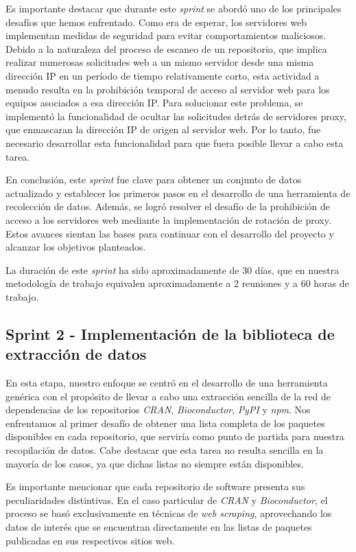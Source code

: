 Es importante destacar que durante este \textit{sprint} se abordó uno de los principales desafíos que hemos enfrentado. 
Como era de esperar, los servidores web implementan medidas de seguridad para evitar comportamientos maliciosos. Debido 
a la naturaleza del proceso de escaneo de un repositorio, que implica realizar numerosas solicitudes web a un mismo servidor 
desde una misma dirección IP en un período de tiempo relativamente corto, esta actividad a menudo resulta en la prohibición temporal de acceso al servidor web para los equipos asociados a esa dirección IP. Para solucionar este problema, se implementó la funcionalidad de ocultar las solicitudes detrás de servidores proxy, que enmascaran la dirección IP de origen al servidor web. Por lo tanto, fue necesario desarrollar esta funcionalidad para que fuera posible llevar a cabo esta tarea.

En conclusión, este \textit{sprint} fue clave para obtener un conjunto de datos actualizado y establecer los primeros 
pasos en el desarrollo de una herramienta de recolección de datos. Además, se logró resolver el desafío de la prohibición 
de acceso a los servidores web mediante la implementación de rotación de proxy. Estos avances sientan las bases para continuar con el desarrollo 
del proyecto y alcanzar los objetivos planteados.

La duración de este \textit{sprint} ha sido aproximadamente de 30 días, que en nuestra metodología de trabajo equivalen 
aproximadamente a 2 reuniones y a 60 horas de trabajo.

\subsection{Sprint 2 - Implementación de la biblioteca de extracción de datos}

En esta etapa, nuestro enfoque se centró en el desarrollo de una herramienta genérica con el propósito de llevar a cabo 
una extracción sencilla de la red de dependencias de los repositorios \textit{CRAN}, \textit{Bioconductor}, \textit{PyPI} 
y \textit{npm}. Nos enfrentamos al primer desafío de obtener una lista completa de los paquetes disponibles en cada 
repositorio, que serviría como punto de partida para nuestra recopilación de datos. Cabe destacar que esta tarea no 
resulta sencilla en la mayoría de los casos, ya que dichas listas no siempre están disponibles.

Es importante mencionar que cada repositorio de software presenta sus peculiaridades distintivas. En el caso particular 
de \textit{CRAN} y \textit{Bioconductor}, el proceso se basó exclusivamente en técnicas de \textit{web scraping}, 
aprovechando los datos de interés que se encuentran directamente en las listas de paquetes publicadas en sus respectivos 
sitios web.

